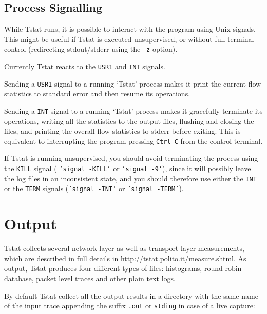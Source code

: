 \documentclass[11pt]{article}
\begin{document}
\subsection{Process Signalling\label{Process_Signalling}}


While Tstat runs, it is possible to interact with the program using Unix signals. 
This might be useful if Tstat is executed unsupervised, or without full terminal control 
(redirecting stdout/stderr using the \texttt{-z} option).



Currently Tstat reacts to the \texttt{USR1} and \texttt{INT} signals.



Sending a \texttt{USR1} signal to a running ‘Tstat’ process makes it print the current flow 
statistics to standard error and then resume its operations.



Sending a \texttt{INT} signal to a running ‘Tstat’ process makes it gracefully terminate its 
operations, writing all the statistics to the output files, flushing and closing the files, and
printing the overall flow statistics to stderr before exiting. This is equivalent to interrupting
the program pressing \texttt{Ctrl-C} from the control terminal.



If Tstat is running unsupervised, you should avoid terminating the process using the \texttt{KILL} signal
( \texttt{'signal -KILL'} or \texttt{'signal -9'}), since it will possibly leave the log files in an 
inconsistent state, and you should therefore use either the \texttt{INT} or the \texttt{TERM} signals
 (\texttt{'signal -INT'} or \texttt{'signal -TERM'}).

\section{Output\label{Output}}


Tstat collects several network-layer as well as transport-layer measurements,
which are described in full details in \textsf{http://tstat.polito.it/measure.shtml}.
As output, Tstat produces four different types of files: histograms, round robin database, 
packet level traces and other plain text logs.



By default Tstat collect all the output results in a directory with the same name of the input 
trace appending the suffix \texttt{.out} or \texttt{stding} in case of a live capture:
\end{document}
